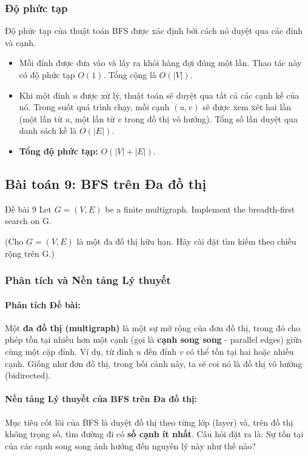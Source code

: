 \documentclass[a4paper,12pt]{article}
\begin{document}
\subsubsection{Độ phức tạp}
Độ phức tạp của thuật toán BFS được xác định bởi cách nó duyệt qua các đỉnh và cạnh.
\begin{itemize}
    \item Mỗi đỉnh được đưa vào và lấy ra khỏi hàng đợi đúng một lần. Thao tác này có độ phức tạp $O(1)$. Tổng cộng là $O(|V|)$.
    \item Khi một đỉnh $u$ được xử lý, thuật toán sẽ duyệt qua tất cả các cạnh kề của nó. Trong suốt quá trình chạy, mỗi cạnh $(u, v)$ sẽ được xem xét hai lần (một lần từ $u$, một lần từ $v$ trong đồ thị vô hướng). Tổng số lần duyệt qua danh sách kề là $O(|E|)$.
    \item \textbf{Tổng độ phức tạp:} $O(|V| + |E|)$.
\end{itemize}


\subsection{Bài toán 9: BFS trên Đa đồ thị}
\begin{problembox}{Đề bài 9}
    Let $G = (V,E)$ be a finite multigraph. Implement the breadth-first search on G.
    
    (Cho $G = (V,E)$ là một đa đồ thị hữu hạn. Hãy cài đặt tìm kiếm theo chiều rộng trên G.)
\end{problembox}

\subsubsection{Phân tích và Nền tảng Lý thuyết}
\paragraph{Phân tích Đề bài:}
Một \textbf{đa đồ thị (multigraph)} là một sự mở rộng của đơn đồ thị, trong đó cho phép tồn tại nhiều hơn một cạnh (gọi là \textbf{cạnh song song} - parallel edges) giữa cùng một cặp đỉnh. Ví dụ, từ đỉnh $u$ đến đỉnh $v$ có thể tồn tại hai hoặc nhiều cạnh. Giống như đơn đồ thị, trong bối cảnh này, ta sẽ coi nó là đồ thị vô hướng (bidirected).

\paragraph{Nền tảng Lý thuyết của BFS trên Đa đồ thị:}
Mục tiêu cốt lõi của BFS là duyệt đồ thị theo từng lớp (layer) và, trên đồ thị không trọng số, tìm đường đi có \textbf{số cạnh ít nhất}. Câu hỏi đặt ra là: Sự tồn tại của các cạnh song song ảnh hưởng đến nguyên lý này như thế nào?
\end{document}
